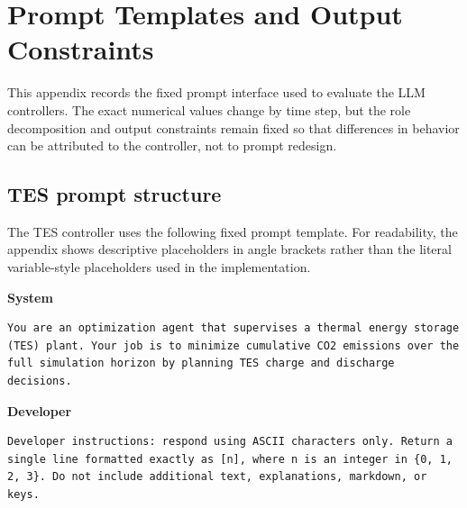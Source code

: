 \documentclass[11pt]{article}
\newcommand{\promptrole}[1]{\par\Needspace*{6\baselineskip}\noindent\textbf{#1}\par\nopagebreak}
\begin{document}
\section{Prompt Templates and Output Constraints}\label{app:prompts}
This appendix records the fixed prompt interface used to evaluate the LLM controllers. The exact numerical values change by time step, but the role decomposition and output constraints remain fixed so that differences in behavior can be attributed to the controller, not to prompt redesign.

\subsection{TES prompt structure}
The TES controller uses the following fixed prompt template. For readability, the appendix shows descriptive placeholders in angle brackets rather than the literal variable-style placeholders used in the implementation.

\promptrole{System}
\begin{lstlisting}[style=promptblock]
You are an optimization agent that supervises a thermal energy storage (TES) plant. Your job is to minimize cumulative CO2 emissions over the full simulation horizon by planning TES charge and discharge decisions.
\end{lstlisting}

\promptrole{Developer}
\begin{lstlisting}[style=promptblock]
Developer instructions: respond using ASCII characters only. Return a single line formatted exactly as [n], where n is an integer in {0, 1, 2, 3}. Do not include additional text, explanations, markdown, or keys.
\end{lstlisting}
\end{document}
